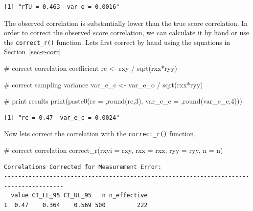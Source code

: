 \documentclass[
  letterpaper,
  DIV=11,
  numbers=noendperiod]{scrreprt}
\newenvironment{Shaded}{\begin{snugshade}}{\end{snugshade}}
\newcommand{\AttributeTok}[1]{\textcolor[rgb]{0.40,0.45,0.13}{#1}}
\newcommand{\CommentTok}[1]{\textcolor[rgb]{0.37,0.37,0.37}{#1}}
\newcommand{\DecValTok}[1]{\textcolor[rgb]{0.68,0.00,0.00}{#1}}
\newcommand{\FunctionTok}[1]{\textcolor[rgb]{0.28,0.35,0.67}{#1}}
\newcommand{\NormalTok}[1]{\textcolor[rgb]{0.00,0.23,0.31}{#1}}
\newcommand{\OtherTok}[1]{\textcolor[rgb]{0.00,0.23,0.31}{#1}}
\newcommand{\SpecialCharTok}[1]{\textcolor[rgb]{0.37,0.37,0.37}{#1}}
\newcommand{\StringTok}[1]{\textcolor[rgb]{0.13,0.47,0.30}{#1}}
\begin{document}
\begin{verbatim}
[1] "rTU = 0.463  var_e = 0.0016"
\end{verbatim}

The observed correlation is substantially lower than the true score
correlation. In order to correct the observed score correlation, we can
calculate it by hand or use the \texttt{correct\_r()} function. Lets
first correct by hand using the equations in Section~\ref{sec-r-corr}

\begin{Shaded}
\begin{Highlighting}[]
\CommentTok{\# correct correlation coefficient}
\NormalTok{rc }\OtherTok{\textless{}{-}}\NormalTok{ rxy }\SpecialCharTok{/} \FunctionTok{sqrt}\NormalTok{(rxx}\SpecialCharTok{*}\NormalTok{ryy)}

\CommentTok{\# correct sampling variance}
\NormalTok{var\_e\_c }\OtherTok{\textless{}{-}}\NormalTok{ var\_e\_o }\SpecialCharTok{/} \FunctionTok{sqrt}\NormalTok{(rxx}\SpecialCharTok{*}\NormalTok{ryy)}

\CommentTok{\# print results}
\FunctionTok{print}\NormalTok{(}\FunctionTok{paste0}\NormalTok{(}\StringTok{\textquotesingle{}rc = \textquotesingle{}}\NormalTok{,}\FunctionTok{round}\NormalTok{(rc,}\DecValTok{3}\NormalTok{),}\StringTok{\textquotesingle{}  var\_e\_c = \textquotesingle{}}\NormalTok{,}\FunctionTok{round}\NormalTok{(var\_e\_c,}\DecValTok{4}\NormalTok{)))}
\end{Highlighting}
\end{Shaded}

\begin{verbatim}
[1] "rc = 0.47  var_e_c = 0.0024"
\end{verbatim}

Now lets correct the correlation with the \texttt{correct\_r()}
function,

\begin{Shaded}
\begin{Highlighting}[]
\CommentTok{\# correct correlation}
\FunctionTok{correct\_r}\NormalTok{(}\AttributeTok{rxyi =}\NormalTok{ rxy,}
          \AttributeTok{rxx =}\NormalTok{ rxx,}
          \AttributeTok{ryy =}\NormalTok{ ryy,}
          \AttributeTok{n =}\NormalTok{ n)}
\end{Highlighting}
\end{Shaded}

\begin{verbatim}
Correlations Corrected for Measurement Error:
---------------------------------------------------------------------------------------
  value CI_LL_95 CI_UL_95   n n_effective
1  0.47    0.364    0.569 500         222
\end{verbatim}
\end{document}
